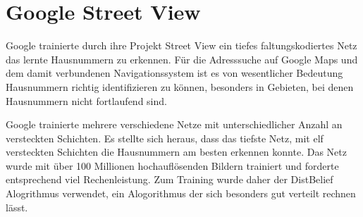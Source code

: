 
\section{Google Street View}

Google trainierte durch ihre Projekt Street View ein tiefes faltungskodiertes Netz das lernte Hausnummern zu erkennen. Für die Adresssuche auf Google Maps und dem damit verbundenen Navigationssystem ist es von wesentlicher Bedeutung Hausnummern richtig identifizieren zu können, besonders in Gebieten, bei denen Hausnummern nicht fortlaufend sind.


Google trainierte mehrere verschiedene Netze mit unterschiedlicher Anzahl an versteckten Schichten. Es stellte sich heraus, dass das tiefste Netz, mit elf versteckten Schichten die Hausnummern am besten erkennen konnte. Das Netz wurde mit über 100 Millionen hochauflösenden Bildern trainiert und forderte entsprechend viel Rechenleistung. Zum Training wurde daher der DistBelief Alogrithmus verwendet, ein Alogorithmus der sich besonders gut verteilt rechnen lässt. 

